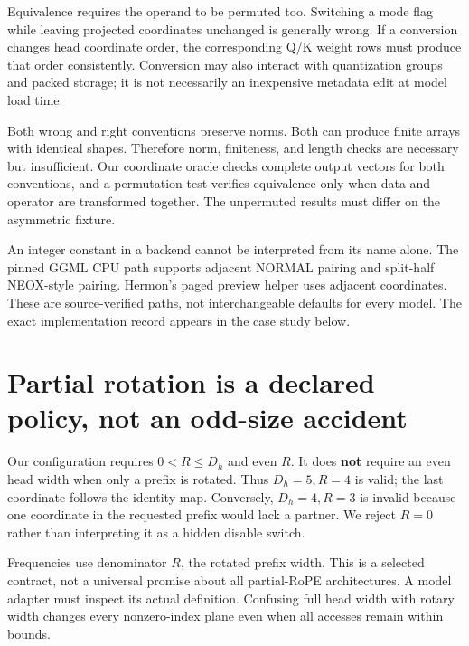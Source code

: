 Equivalence requires the operand to be permuted too. Switching a mode
flag while leaving projected coordinates unchanged is generally wrong.
If a conversion changes head coordinate order, the corresponding Q/K
weight rows must produce that order consistently. Conversion may also
interact with quantization groups and packed storage; it is not
necessarily an inexpensive metadata edit at model load time.

Both wrong and right conventions preserve norms. Both can produce finite
arrays with identical shapes. Therefore norm, finiteness, and length
checks are necessary but insufficient. Our coordinate oracle checks
complete output vectors for both conventions, and a permutation test
verifies equivalence only when data and operator are transformed
together. The unpermuted results must differ on the asymmetric fixture.

An integer constant in a backend cannot be interpreted from its name
alone. The pinned GGML CPU path supports adjacent NORMAL pairing and
split-half NEOX-style pairing. Hermon's paged preview helper uses
adjacent coordinates. These are source-verified paths, not
interchangeable defaults for every model. The exact implementation
record appears in the case study below.

\section{Partial rotation is a declared policy, not an odd-size
accident}\label{partial-rotation-is-a-declared-policy-not-an-odd-size-accident}


Our configuration requires \(0<R\le D_h\) and even \(R\). It does
\textbf{not} require an even head width when only a prefix is rotated.
Thus \(D_h=5,R=4\) is valid; the last coordinate follows the identity
map. Conversely, \(D_h=4,R=3\) is invalid because one coordinate in the
requested prefix would lack a partner. We reject \(R=0\) rather than
interpreting it as a hidden disable switch.

Frequencies use denominator \(R\), the rotated prefix width. This is a
selected contract, not a universal promise about all partial-RoPE
architectures. A model adapter must inspect its actual definition.
Confusing full head width with rotary width changes every nonzero-index
plane even when all accesses remain within bounds.

